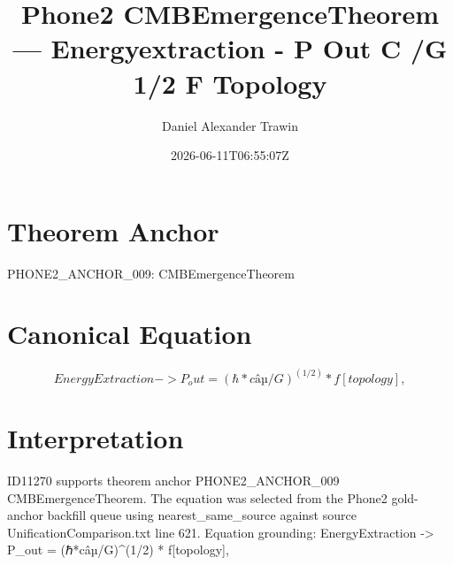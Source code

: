 \documentclass[11pt]{article}
\title{Phone2 CMBEmergenceTheorem — Energyextraction - P Out C /G 1/2 F Topology}
\author{Daniel Alexander Trawin}
\date{2026-06-11T06:55:07Z}
\begin{document}
\maketitle
\section*{Theorem Anchor}
PHONE2_ANCHOR_009: CMBEmergenceTheorem
\section*{Canonical Equation}
\[
EnergyExtraction -> P_out = (ℏ*câµ/G)^(1/2) * f[topology],
\]
\section*{Interpretation}
ID11270 supports theorem anchor PHONE2_ANCHOR_009 CMBEmergenceTheorem. The equation was selected from the Phone2 gold-anchor backfill queue using nearest_same_source against source UnificationComparison.txt line 621. Equation grounding: EnergyExtraction -> P_out = (ℏ*câµ/G)^(1/2) * f[topology],
\end{document}
